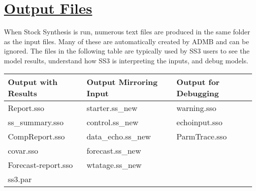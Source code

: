 \hypertarget{OutputFiles}{}
\section[Output Files]{\protect\hyperlink{OutputFiles}{Output Files}}

When Stock Synthesis is run, numerous text files are produced in the same folder as the input files. Many of these are automatically created by ADMB and can be ignored. The files in the following table are typically used by SS3 users to see the model results, understand how SS3 is interpreting the inputs, and debug models.

\begin{longtable}{| p{5cm} | p{5cm} | p{5cm} |}
	\hline
	\textbf{Output with Results} & \textbf{Output Mirroring Input} & \textbf{Output for Debugging} \Tstrut\Bstrut\\ 
	\hline
    Report.sso & starter.ss\_new & warning.sso \\
    ss\_summary.sso & control.ss\_new & echoinput.sso \\
    CompReport.sso & data\_echo.ss\_new & ParmTrace.sso \\
    covar.sso & forecast.ss\_new & \\
    Forecast-report.sso & wtatage.ss\_new & \\
    ss3.par & & \\
    \hline
\end{longtable}


